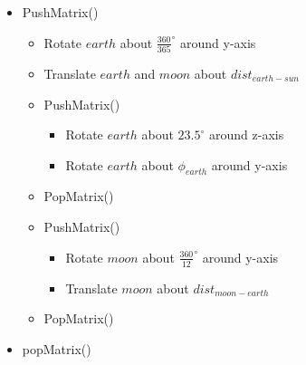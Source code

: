 \documentclass{article}
\begin{document}
\begin{itemize}
\item PushMatrix()
\begin{itemize}
\item Rotate $earth$ about $\frac{360}{365}^{\circ}$ around y-axis
\item Translate $earth$ and $moon$ about $dist_{earth-sun}$
\item PushMatrix()
\begin{itemize}
\item Rotate $earth$ about $23.5^{\circ}$ around z-axis
\item Rotate $earth$ about $\phi_{earth}$ around y-axis
\end{itemize}
\item PopMatrix()
\item PushMatrix()
\begin{itemize}
\item Rotate $moon$ about $\frac{360}{12}^{\circ}$ around y-axis
\item Translate $moon$ about $dist_{moon-earth}$
\end{itemize}
\item PopMatrix()
\end{itemize}

\item popMatrix()
\end{itemize}
\end{document}
